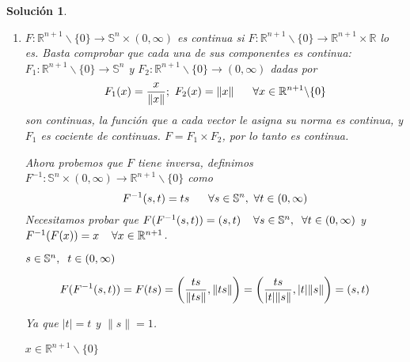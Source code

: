 \documentclass{article}
\theoremstyle{remark,bold} \newtheorem{exercise}{Ejercicio}
\newtheorem*{solution}{Solución}
\begin{document}
\begin{solution}

  \text{ }
  
  \begin{enumerate}

  \item $F : \mathbb{R}^{n+1} \backslash \{0\} \longrightarrow
    \mathbb{S}^n \times (0, \infty)$ es continua si $F : \mathbb{R}^{n+1}
    \backslash \{0\} \longrightarrow \mathbb{R}^{n+1} \times \mathbb{R}$
    lo es. Basta comprobar que cada una de sus componentes es continua:
    $F_1 : \mathbb{R}^{n+1} \backslash \{0\} \longrightarrow \mathbb{S}^n$
    y $F_2 : \mathbb{R}^{n+1} \backslash \{0\} \longrightarrow (0,
    \infty)$ dadas por \vspace{2mm}
    \[F_1(x) = \frac{x}{\|x\|}; \text{ } F_2(x) = \|x\| \hspace{6mm}
      \forall x \in \mathbb{R}^{n+1} \backslash \{0\} \vspace{4mm}\] son
    continuas, la función que a cada vector le asigna su norma es
    continua, y $F_1$ es cociente de continuas. $F = F_1 \times F_2$, por
    lo tanto es continua.

    Ahora probemos que $F$ tiene inversa, definimos $F^{-1} :
    \mathbb{S}^n \times (0, \infty) \longrightarrow \mathbb{R}^{n+1}
    \backslash \{0\}$ como
    \[F^{-1}(s,t) = ts \hspace{6mm} \forall s \in \mathbb{S}^n, \text{
      } \forall t \in (0, \infty)\] Necesitamos probar que $F(F^{-1}(s, t))
    = (s, t) \hspace{4mm} \forall s \in \mathbb{S}^n, \hspace{2mm} \forall
    t \in (0, \infty)$ y \\ $F^{-1}(F(x)) = x \hspace{4mm} \forall x \in
    \mathbb{R}^{n+1}$.
    
    $s \in \mathbb{S}^n, \hspace{2mm} t \in (0, \infty)$ \vspace{-2mm}
    
    \[F(F^{-1}(s, t)) = F(ts) = \bigg(\frac{ts}{\|ts\|}, \|ts\|\bigg)
      \\ \vspace{4mm} = \bigg(\frac{ts}{|t|\|s\|}, |t| \|s\|\bigg) = (s,
      t)\]

    Ya que $|t| = t$ y $\|s\| = 1$. \vspace{2mm}
    
    $ x \in \mathbb{R}^{n+1} \backslash \{0\}$ \vspace{-2mm}


\end{enumerate}
\end{solution}
\end{document}

